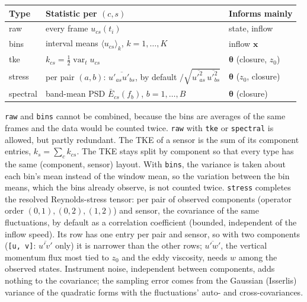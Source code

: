 \documentclass[11pt,a4paper]{article}
\begin{document}
\begin{center}
\begin{tabular}{@{}lll@{}}
\toprule
Type & Statistic per $(c, s)$ & Informs mainly \\
\midrule
raw & every frame $u_{cs}(t_i)$ & state, inflow \\
bins & interval means $\langle u_{cs}\rangle_k$, $k = 1,\dots,K$ & inflow $\bm x$ \\
tke & $k_{cs} = \tfrac12 \operatorname{var}_t u_{cs}$ & $\bm\theta$ (closure, $z_0$) \\
stress & per pair $(a, b)$: $\overline{u'_{as} u'_{bs}}$, by default $/\sqrt{\overline{u'^2_{as}}\,\overline{u'^2_{bs}}}$ & $\bm\theta$ ($z_0$, closure) \\
spectral & band-mean PSD $\bar E_{cs}(f_b)$, $b = 1,\dots,B$ & $\bm\theta$ (closure) \\
\bottomrule
\end{tabular}
\end{center}

\noindent \texttt{raw} and \texttt{bins} cannot be combined, because the bins
are averages of the same frames and the data would be counted twice.
\texttt{raw} with \texttt{tke} or \texttt{spectral} is allowed, but partly
redundant. The TKE of a sensor is the sum of its component entries,
$k_s = \sum_c k_{cs}$. The TKE stays split by component so that every type has
the same (component, sensor) layout. With \texttt{bins}, the variance is taken
about each bin's mean instead of the window mean, so the variation between
the bin means, which the bins already observe, is not counted twice.
\texttt{stress} completes the resolved Reynolds-stress tensor: per pair of
observed components (operator order $(0,1), (0,2), (1,2)$) and sensor, the
covariance of the same fluctuations, by default as a correlation coefficient
(bounded, independent of the inflow speed). Its row has one entry per pair
and sensor, so with two components (\texttt{[u, v]}: $\overline{u'v'}$ only)
it is narrower than the other rows; $\overline{u'w'}$, the vertical momentum
flux most tied to $z_0$ and the eddy viscosity, needs $w$ among the observed
states. Instrument noise, independent between components, adds nothing to the
covariance; the sampling error comes from the Gaussian (Isserlis) variance of
the quadratic forms with the fluctuations' auto- and cross-covariances.
\end{document}
